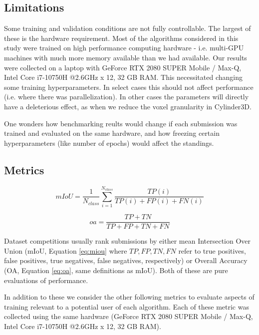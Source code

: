 \subsection{Limitations}
\label{limitations}

Some training and validation conditions are not fully controllable. The largest of these is the hardware requirement. Most of the algorithms considered in this study were trained on high performance computing hardware - i.e. multi-GPU machines with much more memory available than we had available. Our results were collected on a laptop with GeForce RTX 2080 SUPER Mobile / Max-Q, Intel Core i7-10750H @2.6GHz x 12, 32 GB RAM. This necessitated changing some training hyperparameters. In select cases this should not affect performance (i.e. where there was parallelization). In other cases the parameters will directly have a deleterious effect, as when we reduce the voxel granularity in Cylinder3D.

One wonders how benchmarking reults would change if each submission was trained and evaluated on the same hardware, and how freezing certain hyperparameters (like number of epochs) would affect the standings.

\subsection{Metrics}
\label{sec:metrics}

\begin{equation}
  \label{eq:miou}
  mIoU = \frac{1}{N_{class}}\sum_{i=1}^{N_{class}} \frac{TP(i)}{TP(i) + FP(i) + FN(i)}
\end{equation}

\begin{equation}
  \label{eq:oa}
  oa = \frac{TP + TN}{TP + FP + TN + FN}
\end{equation}

Dataset competitions usually rank submissions by either mean Intersection Over Union (mIoU, Equation \ref{eq:miou} where $TP,FP,TN,FN$ refer to true positives, false positives, true negatives, false negatives, respectively) or Overall Accuracy (OA, Equation \ref{eq:oa}, same definitions as mIoU). Both of these are pure evaluations of performance.

In addition to these we consider the other following metrics to evaluate aspects of training relevant to a potential user of each algorithm. Each of these metric was collected using the same hardware (GeForce RTX 2080 SUPER Mobile / Max-Q, Intel Core i7-10750H @2.6GHz x 12, 32 GB RAM).

